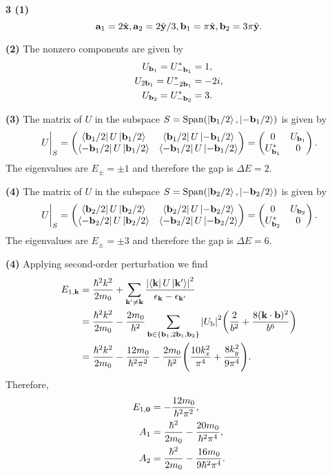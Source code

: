 \documentclass{article}
\makeatletter
\newcommand*{\shifttext}[1]{%
  \settowidth{\@tempdima}{#1}%
  \hspace{-\@tempdima}#1%
}
\newcommand{\plabel}[1]{%
\shifttext{\textbf{#1}\quad}%
}
\newcommand{\prule}{%
\begin{center}%
\hdashrule[0.5ex]{.99\linewidth}{1pt}{1pt 2.5pt}%
\end{center}%
}
\newcommand{\minusbaseline}{\abovedisplayskip=0pt\abovedisplayshortskip=0pt~\vspace*{-\baselineskip}}%
\makeatother
\begin{document}
\prule

\plabel{3 (1)}%
\begingroup\minusbaseline
\[ \vb{a}_1 = 2\hat{\vb{x}}, \vb{a}_2 = 2\hat{\vb{y}}/3, \vb{b}_1 = \pi\hat{\vb{x}}, \vb{b}_2 = 3\pi\hat{\vb{y}}. \]
\endgroup

\plabel{(2)}%
The nonzero components are given by
\begin{align*}
    U_{\vb{b}_1} = U_{-\vb{b}_1}^* &= 1, \\
    U_{2\vb{b}_1} = U_{-2\vb{b}_1}^* &= -2i, \\
    U_{\vb{b}_2} = U_{-\vb{b}_2}^* &= 3.
\end{align*}

\plabel{(3)}%
The matrix of $U$ in the subspace $S=\operatorname{Span}(\ket{\vb{b}_1/2}, \ket{-\vb{b}_1/2})$ is given by
\[ \eval{U}_S = \begin{pmatrix}
    \bra{\vb{b}_1/2} U \ket{\vb{b}_1/2} & \bra{\vb{b}_1/2} U \ket{-\vb{b}_1/2} \\
    \bra{-\vb{b}_1/2} U \ket{\vb{b}_1/2} & \bra{-\vb{b}_1/2} U \ket{-\vb{b}_1/2}
\end{pmatrix} = \begin{pmatrix}
    0 & U_{\vb{b}_1} \\
    U^*_{\vb{b}_1} & 0
\end{pmatrix}. \]
The eigenvalues are $E_\pm = \pm 1$ and therefore the gap is $\Delta E = 2$.

\plabel{(4)}%
The matrix of $U$ in the subspace $S=\operatorname{Span}(\ket{\vb{b}_2/2}, \ket{-\vb{b}_2/2})$ is given by
\[ \eval{U}_S = \begin{pmatrix}
    \bra{\vb{b}_2/2} U \ket{\vb{b}_2/2} & \bra{\vb{b}_2/2} U \ket{-\vb{b}_2/2} \\
    \bra{-\vb{b}_2/2} U \ket{\vb{b}_2/2} & \bra{-\vb{b}_2/2} U \ket{-\vb{b}_2/2}
\end{pmatrix} = \begin{pmatrix}
    0 & U_{\vb{b}_2} \\
    U^*_{\vb{b}_2} & 0
\end{pmatrix}. \]
The eigenvalues are $E_\pm = \pm 3$ and therefore the gap is $\Delta E = 6$.

\plabel{(4)}%
Applying second-order perturbation we find
\begin{align*}
    E_{1,\vb{k}} &= \frac{\hbar^2 k^2}{2m_0} + \sum_{\vb{k}'\neq \vb{k}} \frac{\abs{\bra{\vb{k}}U \ket{\vb{k}'}}^2}{\epsilon_{\vb{k}} - \epsilon_{\vb{k}'}} \\
    &= \frac{\hbar^2 k^2}{2m_0} - \frac{2m_0}{\hbar^2} \sum_{\vb{b}\in\qty{\vb{b}_1, 2\vb{b}_1,\vb{b}_2}} \abs{U_{\mathrm{b}}}^2 \qty(\frac{2}{b^2} + \frac{8(\vb{k}\cdot \vb{b})^2}{b^6}) \\
    &= \frac{\hbar^2 k^2}{2m_0} - \frac{12m_0}{\hbar^2\pi^2} - \frac{2m_0}{\hbar^2} \qty(\frac{10k_x^2}{\pi^4} + \frac{8k_y^2}{9\pi^4}).
\end{align*}
Therefore,
\begin{align*}
    E_{1,\vb{0}} &= -\frac{12m_0}{\hbar^2\pi^2}, \\
    A_1 &= \frac{\hbar^2}{2m_0}  - \frac{20m_0}{\hbar^2 \pi^4}, \\
    A_2 &= \frac{\hbar^2}{2m_0}  - \frac{16m_0}{9\hbar^2 \pi^4}.
\end{align*}
\end{document}
